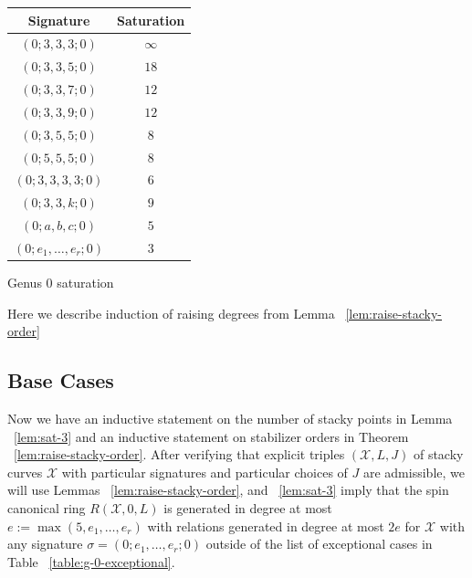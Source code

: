 \documentclass{amsart}
\theoremstyle{plain}
\theoremstyle{definition}
\theoremstyle{remark}
\numberwithin{equation}{section}
\newcommand\ssec{\subsection}
\newcommand \sx{\mathscr X}
\begin{document}
\begin{longtable}
	{| c | c |}
	\hline
	Signature & Saturation \\
	\hline
	\hline

	$(0; 3, 3, 3; 0)$ & $\infty$ \\	\hline

	$(0; 3, 3, 5; 0)$ & $18$ \\	\hline
	
	$(0; 3, 3, 7; 0)$ & $12$ \\	\hline
	
	$(0; 3, 3, 9; 0)$ & $12$ \\	\hline
	
	$(0; 3, 5, 5; 0)$ & $8$ \\	\hline
	
	$(0; 5, 5, 5; 0)$ & $8$ \\	\hline
	
	$(0; 3, 3, 3, 3; 0)$ & $6$ \\	\hline
	
	\hline
	\hline
	
	$(0; 3, 3, k; 0)$ & $9$ \\	\hline
	
	$(0; a, b, c; 0)$ & $5$ \\	\hline
	
	$(0; e_1, \ldots, e_r; 0)$ & $3$ \\	\hline
\end{longtable}

\begin{center}
Genus 0 saturation 
\end{center}

Here we describe induction of raising degrees from Lemma ~\ref{lem:raise-stacky-order}

\ssec{Base Cases}
\label{ssec:g_0_base}
Now we have an inductive statement on the number of stacky
points in Lemma ~\ref{lem:sat-3} and
an inductive statement on stabilizer orders in Theorem
~\ref{lem:raise-stacky-order}. After verifying that explicit triples
$(\sx, L, J)$ of stacky curves $\sx$ with particular signatures and
particular choices of $J$ are admissible, we will use Lemmas ~\ref{lem:raise-stacky-order}, and ~\ref{lem:sat-3} imply that the spin canonical ring
$R(\sx , 0, L)$ is generated in degree at most $e := \max(5, e_1,
\ldots, e_r)$ with relations generated in degree at most $2e$ for
$\sx$ with any signature $\sigma = (0; e_1, \ldots , e_r; 0)$ outside
of the list of exceptional cases in Table ~\ref{table:g-0-exceptional}.
\end{document}
